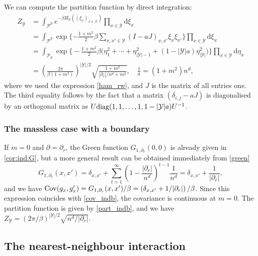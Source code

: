\documentclass[a4paper,11pt]{article}
\theoremstyle{plain}
\theoremstyle{definition}
\begin{document}
We can compute the partition function by direct
integration:
\begin{align}
  Z_\mathcal{Y}&=\int_{\mathcal{P}^\mathcal{Y}}
    e^{-\beta H_\mathcal{Y}((\xi_x)_{x\in\mathcal{X}})}
    \prod_{x\in\mathcal{Y}}\mathrm{d}\xi_x\nonumber\\
  &=\int_{\mathcal{P}^\mathcal{Y}}
    \exp\Big\{{-\frac{1+m^2}{2}\beta\sum_{x,x'\in\mathcal{Y}}
    (I-aJ)_{x,x'}\xi_x\xi_{x'}}\Big\}
    \prod_{x\in\mathcal{Y}}\mathrm{d}\xi_x\nonumber\\
  &=\int_{\mathcal{P}_\mathcal{Y}}\exp\Big\{-\frac{1+m^2}{2}\beta
    \big(\eta_1^2+\cdots+\eta_{|\mathcal{Y}|-1}^2
    +(1-|\mathcal{Y}|a)\eta_{|\mathcal{Y}|}^2\big)
    \Big\}\prod_{x\in\mathcal{Y}}\mathrm{d}\eta_x\nonumber\\
    &=\left(\frac{2\pi}{\beta(1+m^2)}\right)^{|\mathcal{Y}|/2}
    \sqrt{\frac{1+m^2}
      {|\partial_r|/n^d+m^2}},
    \quad \frac{1}{a}=(1+m^2)n^d, \label{part_indb}
\end{align}
where we used the expression \eqref{ham_rw}, and $J$
is the matrix of all entries one. The third equality
follows by the fact that a matrix $(\delta_{i,j}-aJ)$
is diagonalised by an orthogonal matrix as
$U {\rm diag}(1,1,\ldots,1,1-|\mathcal{Y}|a) U^{-1}$.

\subsubsection{The massless case with a boundary}

If $m=0$ and $\partial=\partial_r$, the Green
function $G_{1,\partial_r}(0,0)$ is already
given in \eqref{cor:ind:G}, but a more general
result can be obtained immediately from
\eqref{green}
\[
  G_{1,\partial_r}(x,x')=\delta_{x,x'}+
  \sum_{t=1}^\infty
  \left(1-\frac{|\partial_r|}{n^d}\right)^{t-1}
  \frac{1}{n^d}=
  \delta_{x,x'}+\frac{1}{|\partial_r|},
\]
and we have
${\rm Cov}(g_x,g_x')=G_{1,\partial_r}(x,x')/\beta
  =\left(\delta_{x,x'}+1/|\partial_r|\right)/\beta$.
Since this expression coincides with \eqref{cov_indb},
the covariance is continuous at $m=0$.
The partition function is given by \eqref{part_indb},
and we have
$Z_{\mathcal{Y}}
  =(2\pi/\beta)^{|\mathcal{Y}|/2}
  \sqrt{n^d/|\partial_r|}$.
    
\subsection{The nearest-neighbour interaction}
\label{sect:model:nn}
\end{document}

